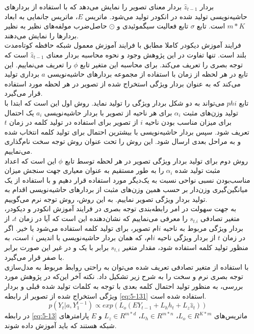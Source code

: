 بردار $\hat{z}_{t-1}$ بردار معنای تصویر را نمایش می‌دهد که با استفاده از بردارهای حاشیه‌نویسی تولید شده در انکودر تولید می‌شود. ماتریس $E$، ماتریس جانمایی به ابعاد $m * K$ است. تابع $\sigma$ تابع فعالیت سیگموئیدی و $\odot$ حاصل‌ضرب مولفه‌های نظیر به نظیر بردارها را نمایش می‌دهند.
\\
فرایند آموزش دیکودر کاملا مطابق با فرایند آموزش معمول شبکه حافظه کوتاه‌مدت بلند است. تنها تفاوت در این پژوهش وجود و نحوه محاسبه بردار معنای $\hat{z}_{t-1}$  است که توجه بصری را تعریف می‌کند. برای محاسبه این متغیر تابع $\phi$ را تعریف می‌نماییم. این تابع در هر لحظه از زمان با استفاده از مجموعه بردارهای حاشیه‌نویسی $a$ برداری تولید می‌کند که به عنوان بردار ویژگی‌ استخراج شده از تصویر در هر لحظه مورد استفاده قرار می‌گیرد.
\\
تابع $phi$ می‌تواند به دو شکل بردار ویژگی را تولید نماید. روش اول این است که ابتدا با تولید وزن‌های مثبت $\alpha_i$ برای هر ناحیه از تصویر با بردار حاشیه‌نویسی $a_i$ یک احتمال برای میزان مناسب بودن ناحیه $i$ از تصویر برای استفاده در تولید کلمه در زمان $t$ تعریف شود. سپس بردار حاشیه‌نویسی با بیشترین احتمال برای تولید کلمه انتخاب شده و به مراحل بعدی ارسال شود. این روش را تحت عنوان روش توجه سخت نام‌گذاری می‌نماییم.
\\
روش دوم برای تولید بردار ویژگی تصویر در هر لحظه توسط تابع $\phi$ این است که اعداد مثبت تولید شده $\alpha_i$ را به طور مستقیم به عنوان معیاری جهت سنجش میزان مناسب‌بودن نسبی نواحی نسبت به یک‌دیگر مورد استفاده قرار دهیم و با استفاده از یک میانگین‌گیری وزن‌دار بر حسب همین وزن‌های مثبت از بردارهای حاشیه‌نویسی اقدام به تولید بردار ویژگی تصویر نماییم. به این روش، روش توجه نرم  می‌گوییم.
\\
به جهت سهولت در امر رابطه‌بندی توجه بصری در فرایند آموزش انکودر و دیکودر، متغیر تصادفی $s_{t.i}$ را معرفی می‌نماییم که نشان‌دهنده این است که آیا در زمان $t$، از بردار ویژگی مربوط به ناحیه $i$ام تصویر، برای تولید کلمه استفاده می‌شود یا خیر. اگر در زمان $t$ از بردار ویژگی ناحیه $i$ام، که همان بردار حاشیه‌نویسی با اندیس $i$ است، به منظور تولید کلمه استفاده شود، مقدار متغیر $s_{t,i}$ برابر با یک و در غیر این‌ صورت برابر با صفر قرار می‌‌گیرد.
\\
با استفاده از متغیر تصادفی تعریف شده می‌توان به راحتی روابط مربوط به مدل‌سازی توجه بصری نرم و سخت را به شرح زیر تشکیل داد. نکته آخر این‌که در پژوهش مورد بررسی، به منظور تولید احتمال کلمه بعدی با توجه به کلمات تولید شده قبلی و بردار ویژگی استخراج شده از تصویر از رابطه \eqref{eq:5-131} استفاده شده است.
\begin{equation}
p(Y_t | a, Y_1^{t-1}) \propto exp(L_o(EY_{t-1} + L_h h_{t} + L_z \hat{z}_t)) 
\label{eq:5-131}
\end{equation}
در رابطه \eqref{eq:5-13} ماتریس‌های $L_o \in R^{K*m}$، $L_h \in R^{m*n}$، $L_z \in R^{m*d}$ و $E$ پارامترهای شبکه هستند که باید آموزش داده شوند.

